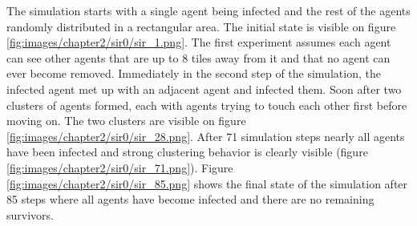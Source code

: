 The simulation starts with a single agent being infected and the rest of the agents randomly distributed in a rectangular area.
The initial state is visible on figure \ref{fig:images/chapter2/sir0/sir_1.png}.
The first experiment assumes each agent can see other agents that are up to 8 tiles away from it and that no agent can ever become removed.
Immediately in the second step of the simulation, the infected agent met up with an adjacent agent and infected them.
Soon after two clusters of agents formed, each with agents trying to touch each other first before moving on.
The two clusters are visible on figure \ref{fig:images/chapter2/sir0/sir_28.png}.
After 71 simulation steps nearly all agents have been infected and strong clustering behavior is clearly visible (figure \ref{fig:images/chapter2/sir0/sir_71.png}).
Figure \ref{fig:images/chapter2/sir0/sir_85.png} shows the final state of the simulation after 85 steps where all agents have become infected and there are no remaining survivors.

